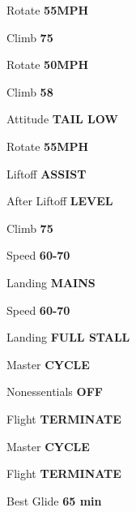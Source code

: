 \documentclass{article}
\begin{document}
\begin{multicols*}{3}
\colorbox{cyan}{}

\colorbox{cyan!70}{}

Rotate \dotfill \textbf{55MPH}

Climb \dotfill \textbf{75}

\colorbox{cyan!70}{}

Rotate \dotfill \textbf{50MPH}

Climb \dotfill \textbf{58}

\colorbox{cyan!70}{}

Attitude \dotfill \textbf{TAIL LOW}

Rotate \dotfill \textbf{55MPH}

Liftoff \dotfill \textbf{ASSIST}

After Liftoff \dotfill \textbf{LEVEL}

Climb \dotfill \textbf{75}

\colorbox{cyan}{}

\colorbox{cyan!70}{}

Speed \dotfill \textbf{60-70}

Landing \dotfill \textbf{MAINS}

\colorbox{cyan!70}{}

Speed \dotfill \textbf{60-70}

Landing \dotfill \textbf{FULL STALL} \\

\colorbox{yellow!80!orange}{}

Master \dotfill \textbf{CYCLE}

Nonessentials \dotfill \textbf{OFF}

Flight \dotfill \textbf{TERMINATE} \\

\colorbox{yellow!80!orange}{}

Master \dotfill \textbf{CYCLE}

Flight \dotfill \textbf{TERMINATE} \\

\colorbox{red!80}{}

Best Glide \dotfill \textbf{65 min}


\end{multicols*}
\end{document}
